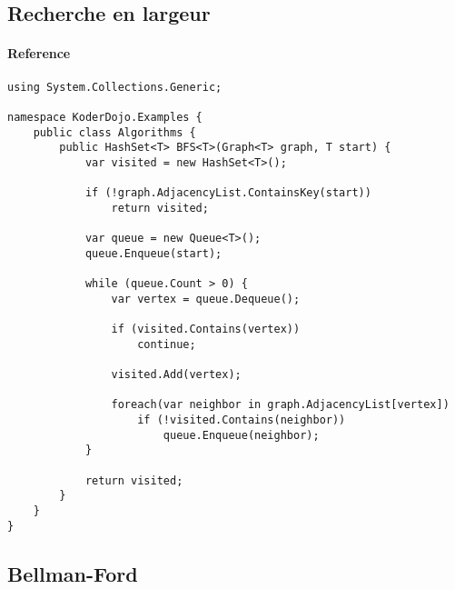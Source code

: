 \newpage
\subsection{Recherche en largeur}
\paragraph{Reference} \cite{Algorithm1}
\begin{lstlisting}
using System.Collections.Generic;

namespace KoderDojo.Examples {
    public class Algorithms {
        public HashSet<T> BFS<T>(Graph<T> graph, T start) {
            var visited = new HashSet<T>();

            if (!graph.AdjacencyList.ContainsKey(start))
                return visited;
                
            var queue = new Queue<T>();
            queue.Enqueue(start);

            while (queue.Count > 0) {
                var vertex = queue.Dequeue();

                if (visited.Contains(vertex))
                    continue;

                visited.Add(vertex);

                foreach(var neighbor in graph.AdjacencyList[vertex])
                    if (!visited.Contains(neighbor))
                        queue.Enqueue(neighbor);
            }

            return visited;
        }
    }
}
\end{lstlisting}

\newpage
\subsection{Bellman-Ford}
